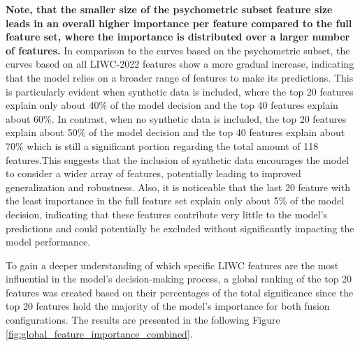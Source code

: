 \textbf{Note, that the smaller size of the psychometric subset feature size leads in an overall higher importance per feature compared to the full feature set, where the importance is distributed over a larger number of features.} In comparison to the curves based on the psychometric subset, the curves based on all LIWC-2022 features show a more gradual increase, indicating that the model relies on a broader range of features to make its predictions. This is particularly evident when synthetic data is included, where the top 20 features explain only about 40\% of the model decision and the top 40 features explain about 60\%. In contrast, when no synthetic data is included, the top 20 features explain about 50\% of the model decision and the top 40 features explain about 70\% which is still a significant portion regarding the total amount of 118 features.This suggests that the inclusion of synthetic data encourages the model to consider a wider array of features, potentially leading to improved generalization and robustness. Also, it is noticeable that the last 20 feature with the least importance in the full feature set explain only about 5\% of the model decision, indicating that these features contribute very little to the model's predictions and could potentially be excluded without significantly impacting the model performance.

To gain a deeper understanding of which specific LIWC features are the most influential in the model's decision-making process, a global ranking of the top 20 features was created based on their percentages of the total significance since the top 20 features hold the majority of the model's importance for both fusion configurations. The results are presented in the following Figure \ref{fig:global_feature_importance_combined}.


